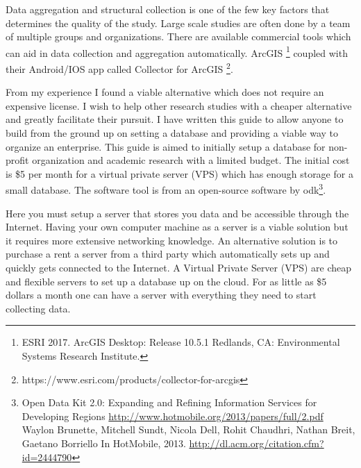 





\indent Data aggregation and structural collection is one of the few key factors that determines the quality of the study. Large scale studies are often done by a team of multiple groups and organizations. There are available commercial tools which can aid in data collection and aggregation automatically. ArcGIS \footnote{ESRI 2017. ArcGIS Desktop: Release 10.5.1 Redlands, CA: Environmental Systems Research Institute.} coupled with their Android/IOS app called Collector for ArcGIS \footnote{https://www.esri.com/products/collector-for-arcgis}.

From my experience I found a viable alternative which does not require an expensive license. I wish to help other research studies with a cheaper alternative and greatly facilitate their pursuit. I have written this guide to allow anyone to build from the ground up on setting a database and providing a viable way to organize an enterprise. This guide is aimed to initially setup a database for non-profit organization and academic research with a limited budget. The initial cost is \$5 per month for a virtual private server (VPS) which has enough storage for a small database.  The software tool is from an open-source software by \gls{odk}\footnote{Open Data Kit 2.0: Expanding and Refining Information Services for Developing Regions \url{http://www.hotmobile.org/2013/papers/full/2.pdf} Waylon Brunette, Mitchell Sundt, Nicola Dell, Rohit Chaudhri, Nathan Breit, Gaetano Borriello In HotMobile, 2013. \url{http://dl.acm.org/citation.cfm?id=2444790}}.




Here you must setup a server that stores you data and be accessible through the Internet. Having your own computer machine as a server is a viable solution but it requires more extensive networking knowledge. An alternative solution is to purchase a rent a server from a third party which automatically sets up and quickly gets connected to the Internet. A Virtual Private Server (VPS) are cheap and flexible servers to set up a database up on the cloud. For as little as \$5 dollars a month one can have a server with everything they need to start collecting data.


